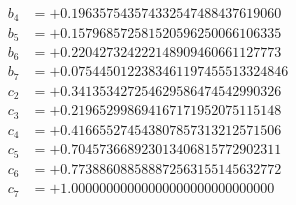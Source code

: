 {\begin{align*}
b_{4} &= +0.196357543574332547488437619060\\
b_{5} &= +0.157968572581520596250066106335\\
b_{6} &= +0.220427324222148909460661127773\\
b_{7} &= +0.0754450122383461197455513324846\\[1mm]
c_{2} &= +0.341353427254629586474542990326\\
c_{3} &= +0.219652998694167171952075115148\\
c_{4} &= +0.416655274543807857313212571506\\
c_{5} &= +0.704573668923013406815772902311\\
c_{6} &= +0.773886088588872563155145632772\\
c_{7} &= +1.00000000000000000000000000000
\end{align*}
}

